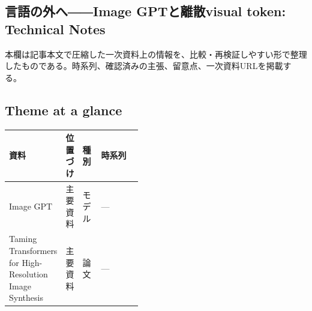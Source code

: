 \subsection*{言語の外へ――Image GPTと離散visual token: Technical Notes}
本欄は記事本文で圧縮した一次資料上の情報を、比較・再検証しやすい形で整理したものである。時系列、確認済みの主張、留意点、一次資料URLを掲載する。
\smallskip
{}\par
\medskip
\subsection*{Theme at a glance}
\begin{center}
\footnotesize
\begin{tabularx}{\linewidth}{@{}p{0.20\linewidth}p{0.10\linewidth}p{0.14\linewidth}X@{}}
\toprule
資料 & 位置づけ & 種別 & 時系列 \\
\midrule
Image GPT & 主要資料 & モデル & — \\
Taming Transformers for High-Resolution Image Synthesis & 主要資料 & 論文 & — \\
\bottomrule
\end{tabularx}
\end{center}
\normalsize

